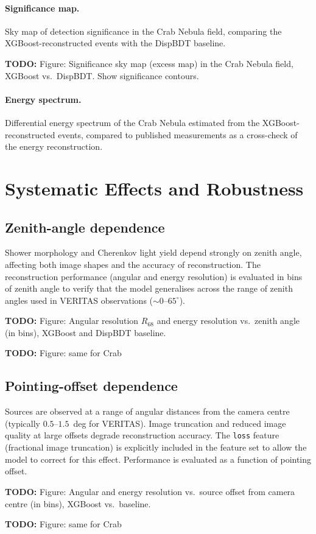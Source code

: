 \documentclass[12pt]{article}
\newcommand{\todo}[1]{\begin{hintBox} \textbf{TODO:} #1 \end{hintBox}}
\begin{document}
\paragraph{Significance map.}
Sky map of detection significance in the Crab Nebula field,
comparing the XGBoost-reconstructed events with the DispBDT baseline.
\todo{Figure: Significance sky map (excess map) in the Crab Nebula field, XGBoost vs.\ DispBDT. Show significance contours.}

\paragraph{Energy spectrum.}
Differential energy spectrum of the Crab Nebula estimated from the
XGBoost-reconstructed events, compared to published measurements
\citep{2015ICRC...34..792M} as a cross-check of the energy reconstruction.

\section{Systematic Effects and Robustness}
\label{sec:systematics}

\subsection{Zenith-angle dependence}

Shower morphology and Cherenkov light yield depend strongly on zenith angle,
affecting both image shapes and the accuracy of reconstruction.
The reconstruction performance (angular and energy resolution) is evaluated
in bins of zenith angle to verify that the model generalises across the
range of zenith angles used in VERITAS observations ($\sim 0$--$65^\circ$).
\todo{Figure: Angular resolution $R_{68}$ and energy resolution vs.\ zenith angle (in bins), XGBoost and DispBDT baseline.}
\todo{Figure: same for Crab}

\subsection{Pointing-offset dependence}

Sources are observed at a range of angular distances from the camera centre
(typically $0.5$--$1.5$~deg for VERITAS).
Image truncation and reduced image quality at large offsets degrade reconstruction
accuracy. The \texttt{loss} feature (fractional image truncation) is explicitly
included in the feature set to allow the model to correct for this effect.
Performance is evaluated as a function of pointing offset.
\todo{Figure: Angular and energy resolution vs.\ source offset from camera centre (in bins), XGBoost vs.\ baseline.}
\todo{Figure: same for Crab}
\end{document}
